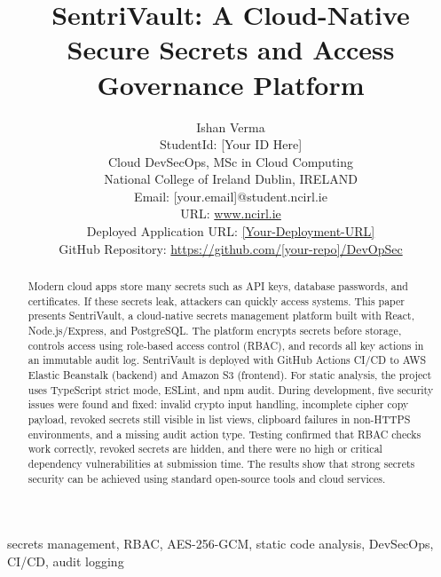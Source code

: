 \documentclass[conference]{IEEEtran}
\begin{document}
% 

\title{SentriVault: A Cloud-Native Secure Secrets and Access Governance Platform}

\author{Ishan Verma\\
StudentId: [Your ID Here]\\
Cloud DevSecOps, MSc in Cloud Computing\\
National College of Ireland Dublin, IRELAND\\
Email: [your.email]@student.ncirl.ie\\
URL: \url{www.ncirl.ie}\\
Deployed Application URL: \url{[Your-Deployment-URL]}\\
GitHub Repository: \url{https://github.com/[your-repo]/DevOpSec}}

\maketitle

\begin{abstract}
Modern cloud apps store many secrets such as API keys, database passwords, and certificates. If these secrets leak, attackers can quickly access systems. This paper presents SentriVault, a cloud-native secrets management platform built with React, Node.js/Express, and PostgreSQL. The platform encrypts secrets before storage, controls access using role-based access control (RBAC), and records all key actions in an immutable audit log. SentriVault is deployed with GitHub Actions CI/CD to AWS Elastic Beanstalk (backend) and Amazon S3 (frontend). For static analysis, the project uses TypeScript strict mode, ESLint, and npm audit. During development, five security issues were found and fixed: invalid crypto input handling, incomplete cipher copy payload, revoked secrets still visible in list views, clipboard failures in non-HTTPS environments, and a missing audit action type. Testing confirmed that RBAC checks work correctly, revoked secrets are hidden, and there were no high or critical dependency vulnerabilities at submission time. The results show that strong secrets security can be achieved using standard open-source tools and cloud services.
\end{abstract}

\begin{IEEEkeywords}
secrets management, RBAC, AES-256-GCM, static code analysis, DevSecOps, CI/CD, audit logging
\end{IEEEkeywords}
\end{document}
